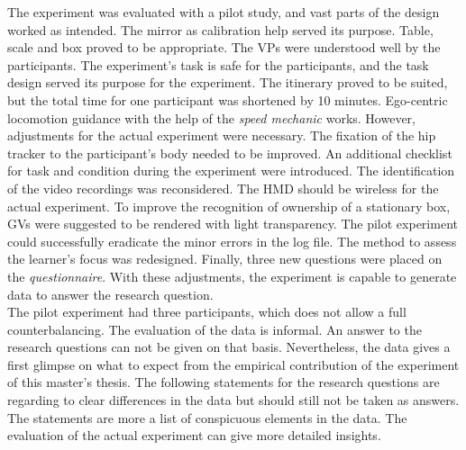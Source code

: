 The experiment was evaluated with a pilot study, and vast parts of the design worked as intended. The mirror as calibration help served its purpose. Table, scale and box proved to be appropriate. The VPs were understood well by the participants. The experiment's task is safe for the participants, and the task design served its purpose for the experiment. The itinerary proved to be suited, but the total time for one participant was shortened by 10 minutes. Ego-centric locomotion guidance with the help of the \textit{speed mechanic} works. However, adjustments for the actual experiment were necessary. The fixation of the hip tracker to the participant's body needed to be improved. An additional checklist for task and condition during the experiment were introduced. The identification of the video recordings was reconsidered. The HMD should be wireless for the actual experiment. To improve the recognition of ownership of a stationary box, GVs were suggested to be rendered with light transparency. The pilot experiment could successfully eradicate the minor errors in the log file. The method to assess the learner's focus was redesigned. Finally, three new questions were placed on the \textit{questionnaire}. With these adjustments, the experiment is capable to generate data to answer the research question.\\

The pilot experiment had three participants, which does not allow a full counterbalancing. The evaluation of the data is informal. An answer to the research questions can not be given on that basis. Nevertheless, the data gives a first glimpse on what to expect from the empirical contribution of the experiment of this master's thesis. The following statements for the research questions are regarding to clear differences in the data but should still not be taken as answers. The statements are more a list of conspicuous elements in the data. The evaluation of the actual experiment can give more detailed insights.

